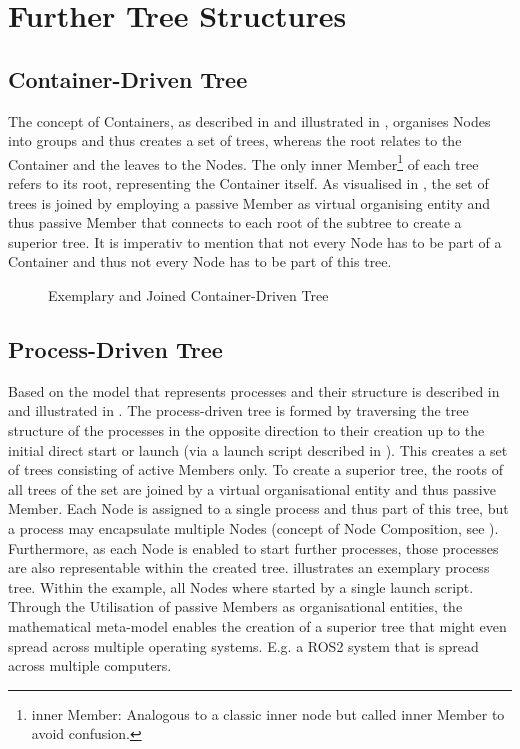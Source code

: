\chapter{Further Tree Structures} \label{app:furtherTreeStructures}

\section*{Container-Driven Tree} \label{app:containerdrivenTree}
The concept of Containers, as described in  and illustrated in , organises Nodes into groups and thus creates a set of trees, whereas the root relates to the Container and the leaves to the Nodes. The only inner Member\footnote{inner Member: Analogous to a classic \glqq{}inner node\grqq{} but called \glqq{}inner Member\grqq{} to avoid confusion.} of each tree refers to its root, representing the Container itself. As visualised in , the set of trees is joined by employing a passive Member as virtual organising entity and thus passive Member that connects to each root of the subtree to create a superior tree. It is imperativ to mention that not every Node has to be part of a Container and thus not every Node has to be part of this tree.
\begin{figure}[h]
    \centering
    
    \caption[Exemplary and Joined Container-Driven Tree]{Exemplary and Joined Container-Driven Tree \legend} \label{fig:tikz:mathModel:containers}
\end{figure}

\section*{Process-Driven Tree} \label{app:processdrivenTree}
Based on the model that represents processes and their structure is described in  and illustrated in . The process-driven tree is formed by traversing the tree structure of the processes in the opposite direction to their creation up to the initial direct start or launch (via a launch script described in ). This creates a set of trees consisting of active Members only. To create a superior tree, the roots of all trees of the set are joined by a virtual organisational entity and thus passive Member. Each Node is assigned to a single process and thus part of this tree, but a process may encapsulate multiple Nodes (concept of Node Composition, see ). Furthermore, as each Node is enabled to start further processes, those processes are also representable within the created tree.  illustrates an exemplary process tree. Within the example, all Nodes where started by a single launch script.
Through the Utilisation of passive Members as organisational entities, the mathematical meta-model enables the creation of a superior tree that might even spread across multiple operating systems. E.g. a ROS2 system that is spread across multiple computers.

